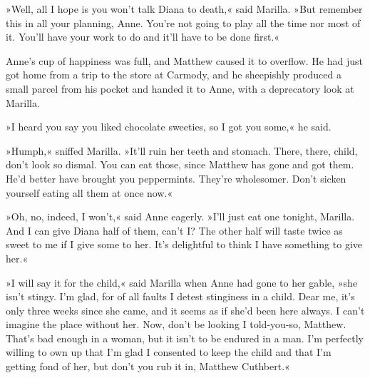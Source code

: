 »Well, all I hope is you won't talk Diana to death,« said Marilla. »But remember this in all your planning, Anne. You're not going to play all the time nor most of it. You'll have your work to do and it'll have to be done first.«

Anne's cup of happiness was full, and Matthew caused it to overflow. He had just got home from a trip to the store at Carmody, and he sheepishly produced a small parcel from his pocket and handed it to Anne, with a deprecatory look at Marilla.

»I heard you say you liked chocolate sweeties, so I got you some,« he said.

»Humph,« sniffed Marilla. »It'll ruin her teeth and stomach. There, there, child, don't look so dismal. You can eat those, since Matthew has gone and got them. He'd better have brought you peppermints. They're wholesomer. Don't sicken yourself eating all them at once now.«

»Oh, no, indeed, I won't,« said Anne eagerly. »I'll just eat one tonight, Marilla. And I can give Diana half of them, can't I? The other half will taste twice as sweet to me if I give some to her. It's delightful to think I have something to give her.«

»I will say it for the child,« said Marilla when Anne had gone to her gable, »she isn't stingy. I'm glad, for of all faults I detest stinginess in a child. Dear me, it's only three weeks since she came, and it seems as if she'd been here always. I can't imagine the place without her. Now, don't be looking I told-you-so, Matthew. That's bad enough in a woman, but it isn't to be endured in a man. I'm perfectly willing to own up that I'm glad I consented to keep the child and that I'm getting fond of her, but don't you rub it in, Matthew Cuthbert.«